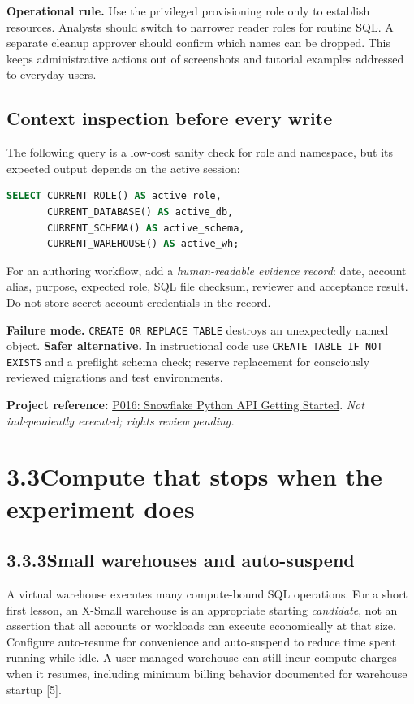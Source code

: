 \documentclass[11pt,twoside]{article}
\newcommand{\topic}[2]{\subsection*{#1\quad #2}}
\newcommand{\repo}[2]{\par\begingroup\fontsize{8.0}{9.6}\selectfont\sffamily\color{inkgray}\textbf{Project reference:} \href{#2}{#1}. \textit{Not independently executed; rights review pending.}\par\endgroup}
\begin{document}
\textbf{Operational rule.} Use the privileged provisioning role only to establish resources. Analysts should switch to narrower reader roles for routine SQL. A separate cleanup approver should confirm which names can be dropped. This keeps administrative actions out of screenshots and tutorial examples addressed to everyday users.

\subsection*{Context inspection before every write}
The following query is a low-cost sanity check for role and namespace, but its expected output depends on the active session:
\begin{lstlisting}[language=SQL,caption={Context checkpoint for the exercise.}]
SELECT CURRENT_ROLE() AS active_role,
       CURRENT_DATABASE() AS active_db,
       CURRENT_SCHEMA() AS active_schema,
       CURRENT_WAREHOUSE() AS active_wh;
\end{lstlisting}
For an authoring workflow, add a \emph{human-readable evidence record}: date, account alias, purpose, expected role, SQL file checksum, reviewer and acceptance result. Do not store secret account credentials in the record.

\textbf{Failure mode.} \texttt{CREATE OR REPLACE TABLE} destroys an unexpectedly named object. \textbf{Safer alternative.} In instructional code use \texttt{CREATE TABLE IF NOT EXISTS} and a preflight schema check; reserve replacement for consciously reviewed migrations and test environments.
\repo{P016: Snowflake Python API Getting Started}{https://github.com/Snowflake-Labs/sfguide-getting-started-snowflake-python-api}

\newpage
\section*{3.3\quad Compute that stops when the experiment does}
\topic{3.3.3}{Small warehouses and auto-suspend}
A virtual warehouse executes many compute-bound SQL operations. For a short first lesson, an X-Small warehouse is an appropriate starting \emph{candidate}, not an assertion that all accounts or workloads can execute economically at that size. Configure auto-resume for convenience and auto-suspend to reduce time spent running while idle. A user-managed warehouse can still incur compute charges when it resumes, including minimum billing behavior documented for warehouse startup [5].
\end{document}
